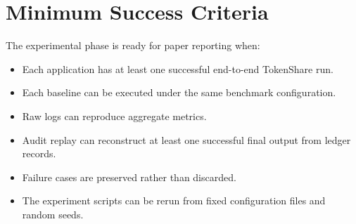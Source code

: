 \documentclass{article}
\theoremstyle{plain}
\begin{document}
\section{Minimum Success Criteria}

The experimental phase is ready for paper reporting when:
\begin{itemize}[leftmargin=*]
  \item Each application has at least one successful end-to-end TokenShare run.
  \item Each baseline can be executed under the same benchmark configuration.
  \item Raw logs can reproduce aggregate metrics.
  \item Audit replay can reconstruct at least one successful final output from ledger records.
  \item Failure cases are preserved rather than discarded.
  \item The experiment scripts can be rerun from fixed configuration files and random seeds.
\end{itemize}
\end{document}
